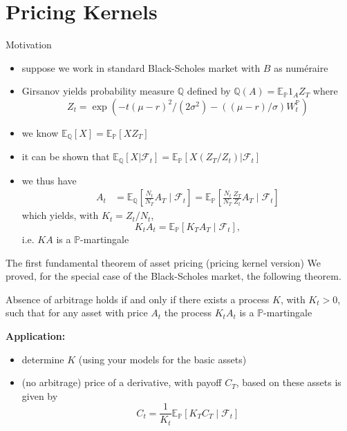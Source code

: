\documentclass[pdf, handout]{beamer}
\renewcommand{\calF}{\mathcal{F}}
\begin{document}
\section{Pricing Kernels}

\begin{frame}{Motivation}
\begin{itemize}
\item
suppose we work in standard Black-Scholes market with $B$ as num\'eraire
\item Girsanov yields probability measure $\mathbb{Q}$ defined by $\mathbb{Q}(A) = \mathbb{E}_{\mathbb{P}} 1_A Z_T$ where
\[
Z_t = \exp\left( - t (\mu-r)^2/(2\sigma^2) 
- ((\mu-r)/\sigma    ) W_t^{\mathbb{P}}
\right)
\]
\item we know 
$\mathbb{E}_{\mathbb{Q}}[ X ]
= \mathbb{E}_{\mathbb{P}}[ X Z_T ]$
\item it can be shown that
$\mathbb{E}_{\mathbb{Q}}[ X |\mathcal{F}_t]
= \mathbb{E}_{\mathbb{P}}[ X (Z_T/Z_t) |\mathcal{F}_t]$
\item we thus have
\begin{align*}
A_t 
&= \mathbb{E}_{\mathbb{Q}}\left[ \frac{N_t}{N_T} A_T \mid \mathcal{F}_t
\right]
=
\mathbb{E}_{\mathbb{P}}\left[ \frac{N_t}{N_T} \frac{ Z_T}{Z_t} A_T \mid \mathcal{F}_t
\right]
\end{align*}
which yields, with $K_t= Z_t / N_t$,
\[
K_t A_t  =\mathbb{E}_{\mathbb{P}}[ K_T A_T \mid
\mathcal{F}_t],
\]
i.e. $KA$ is a $\mathbb{P}$-martingale
\end{itemize}
\end{frame}

\begin{frame}{The first fundamental theorem of asset pricing (pricing kernel version)}
We proved, for the special case of the Black-Scholes market, the following theorem.
\begin{theorem}
Absence of arbitrage holds if and only if there exists a process $K$, with $K_t>0$, such that
for any asset with price $A_t$ the process $K_t A_t$ is a $\mathbb{P}$-martingale
\end{theorem}
\textbf{Application:}
\begin{itemize}
\item determine $K$ (using your models for the basic assets)
\item (no arbitrage) price of a derivative, with payoff $C_T$, based on these assets is given by
\[
C_t=\frac{1}{K_t}\mathbb{E}_{\mathbb{P}}[ K_T C_T \mid \calF_t]
\]
\end{itemize}

\end{frame}
\end{document}
